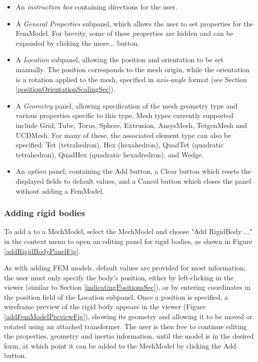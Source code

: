 \documentclass{article}
\begin{document}
\begin{itemize}

\item An {\it instruction box} containing directions for the user.

\item A {\it General Properties} subpanel, which allows the user to set properties
for the FemModel. For brevity, some of these properties are hidden and can
be expanded by clicking the {\sf more...} button.

\item A {\it Location} subpanel, allowing the position and orientation to be
set manually. The position corresponds to the mesh origin, while the
orientation is a rotation applied to the mesh, specified in
{\it axis-angle} format (see Section \ref{positionOrientationScalingSec}).

\item A {\it Geometry} panel, allowing specification of the mesh geometry type
and various properties specific to this type.  Mesh types currently
supported include Grid, Tube, Torus, Sphere, Extrusion, AnsysMesh,
TetgenMesh and UCDMesh.  For many of these, the associated element
type can also be specified: Tet (tetrahedron), Hex (hexahedron),
QuadTet (quadratic tetrahedron), QuadHex (quadratic hexadredron), and
Wedge.

\item An {\it option} panel, containing the {\sf Add} button, a {\sf Clear} button
which resets the displayed fields to default values, and a {\sf Cancel}
button which closes the panel without adding a FemModel.

\end{itemize}

\subsubsection{Adding rigid bodies}

To add a  to a MechModel,
select the MechModel and choose {\sf "Add RigidBody ..."} in the context menu to
open an editing panel for rigid bodies, as shown in Figure \ref{addRigidBodyPanelFig}.

As with adding FEM models, default values are provided for most
information; the user must only specify the body's position, either by
left-clicking in the viewer (similar to Section \ref{indicatingPositionsSec}), or by entering
coordinates in the {\sf position} field of the {\sf Location} subpanel.  Once
a position is specified, a wireframe preview of the rigid body appears
in the viewer (Figure \ref{addFemModelPreviewFig}), showing its geometry and
allowing it to be moved or rotated using an attached transformer. The
user is then free to continue editing the properties, geometry and
inertia information, until the model is in the desired form, at which
point it can be added to the MechModel by clicking the {\sf Add} button.
\end{document}
